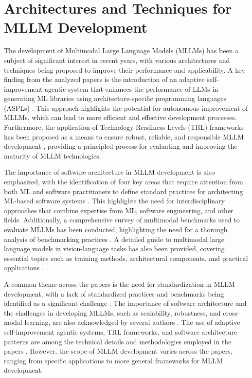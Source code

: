 \documentclass[conference]{IEEEtran}
\begin{document}
\section{Architectures and Techniques for MLLM Development}
The development of Multimodal Large Language Models (MLLMs) has been a subject of significant interest in recent years, with various architectures and techniques being proposed to improve their performance and applicability. A key finding from the analyzed papers is the introduction of an adaptive self-improvement agentic system that enhances the performance of LLMs in generating ML libraries using architecture-specific programming languages (ASPLs) \cite{b1}. This approach highlights the potential for autonomous improvement of MLLMs, which can lead to more efficient and effective development processes. Furthermore, the application of Technology Readiness Levels (TRL) frameworks has been proposed as a means to ensure robust, reliable, and responsible MLLM development \cite{b2}, providing a principled process for evaluating and improving the maturity of MLLM technologies.

The importance of software architecture in MLLM development is also emphasized, with the identification of four key areas that require attention from both ML and software practitioners to define standard practices for architecting ML-based software systems \cite{b3}. This highlights the need for interdisciplinary approaches that combine expertise from ML, software engineering, and other fields. Additionally, a comprehensive survey of multimodal benchmarks used to evaluate MLLMs has been conducted, highlighting the need for a thorough analysis of benchmarking practices \cite{b4}. A detailed guide to multimodal large language models in vision-language tasks has also been provided, covering essential topics such as training methods, architectural components, and practical applications \cite{b5}.

A common theme across the papers is the need for standardization in MLLM development, with a lack of standardized practices and benchmarks being identified as a significant challenge \cite{b1, b3, b4}. The importance of software architecture and the challenges in developing MLLMs, such as scalability, robustness, and cross-modal learning, are also acknowledged by several authors \cite{b1, b4, b5}. The use of adaptive self-improvement agentic systems, TRL frameworks, and software architecture patterns are among the technical details and methodologies employed in the papers \cite{b1, b2, b3}. However, the scope of MLLM development varies across the papers, ranging from specific applications to more general frameworks for MLLM development.
\end{document}
